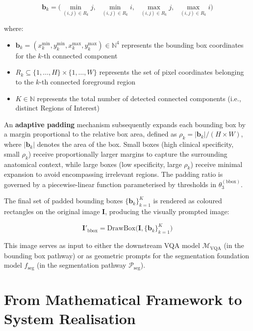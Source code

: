 \begin{equation}
\mathbf{b}_k = \bigl(\min_{(i,j) \in R_k} j, \;\; \min_{(i,j) \in R_k} i, \;\; \max_{(i,j) \in R_k} j, \;\; \max_{(i,j) \in R_k} i\bigr)
\end{equation}

where:
\begin{itemize}
\item $\mathbf{b}_k = (x_k^{\min}, y_k^{\min}, x_k^{\max}, y_k^{\max}) \in \mathbb{N}^4$ represents the bounding box coordinates for the $k$-th connected component
\item $R_k \subseteq \{1,\ldots,H\} \times \{1,\ldots,W\}$ represents the set of pixel coordinates belonging to the $k$-th connected foreground region
\item $K \in \mathbb{N}$ represents the total number of detected connected components (i.e., distinct Regions of Interest)
\end{itemize}

An \textbf{adaptive padding} mechanism subsequently expands each bounding box by a margin proportional to the relative box area, defined as $\rho_k = |\mathbf{b}_k| / (H \times W)$, where $|\mathbf{b}_k|$ denotes the area of the box. Small boxes (high clinical specificity, small $\rho_k$) receive proportionally larger margins to capture the surrounding anatomical context, while large boxes (low specificity, large $\rho_k$) receive minimal expansion to avoid encompassing irrelevant regions. The padding ratio is governed by a piecewise-linear function parameterised by thresholds in $\theta_3^{(\text{bbox})}$.

The final set of padded bounding boxes $\{\mathbf{b}_k\}_{k=1}^{K}$ is rendered as coloured rectangles on the original image $\mathbf{I}$, producing the visually prompted image:

\[
\mathbf{I}'_{\text{bbox}} = \text{DrawBox}\!\bigl(\mathbf{I}, \{\mathbf{b}_k\}_{k=1}^{K}\bigr)
\]

This image serves as input to either the downstream VQA model $\mathcal{M}_{\text{VQA}}$ (in the bounding box pathway) or as geometric prompts for the segmentation foundation model $f_{\text{seg}}$ (in the segmentation pathway $\mathcal{P}_{\text{seg}}$).


\section{From Mathematical Framework to System Realisation}
\label{sec:3_5}


